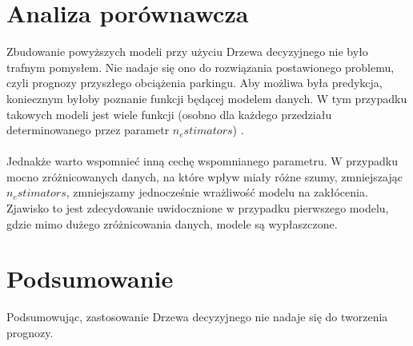 \documentclass[]{article}
\begin{document}
\section{Analiza porównawcza}
Zbudowanie powyższych modeli przy użyciu Drzewa decyzyjnego nie było trafnym pomysłem. Nie nadaje się ono do rozwiązania postawionego problemu, czyli prognozy przyszłego obciążenia parkingu. Aby możliwa była predykcja, koniecznym byłoby poznanie funkcji będącej modelem danych. W tym przypadku takowych modeli jest wiele funkcji (osobno dla każdego przedziału determinowanego przez parametr $n_estimators$) .\\
\\
Jednakże warto wspomnieć inną cechę wspomnianego parametru. W przypadku mocno zróżnicowanych danych, na które wpływ miały różne szumy, zmniejszając $n_estimators$, zmniejszamy jednocześnie wrażliwość modelu na zakłócenia. Zjawisko to jest zdecydowanie uwidocznione w przypadku pierwszego modelu, gdzie mimo dużego zróżnicowania danych, modele są wypłaszczone.

\section{Podsumowanie}
Podsumowując, zastosowanie Drzewa decyzyjnego nie nadaje się do tworzenia prognozy.
\end{document}
